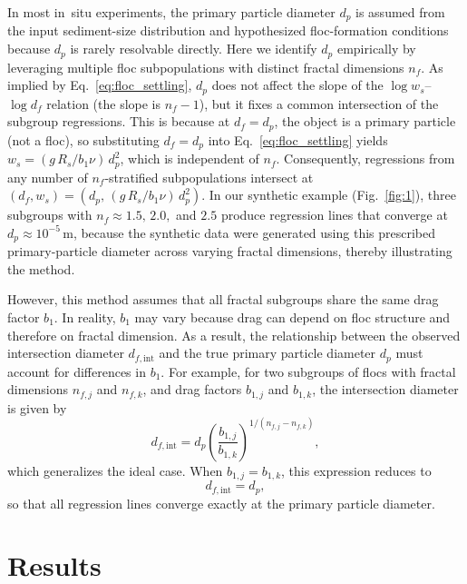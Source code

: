 \documentclass{agujournal2019}
\begin{document}
In most in~situ experiments, the primary particle diameter \(d_p\) is assumed from the input sediment-size distribution and hypothesized floc-formation conditions because \(d_p\) is rarely resolvable directly. Here we identify \(d_p\) empirically by leveraging multiple floc subpopulations with distinct fractal dimensions \(n_f\). As implied by Eq.~\eqref{eq:floc_settling}, \(d_p\) does not affect the slope of the \(\log w_s\)–\(\log d_f\) relation (the slope is \(n_f-1\)), but it fixes a common intersection of the subgroup regressions. This is because at \(d_f=d_p\), the object is a primary particle (not a floc), so substituting \(d_f=d_p\) into Eq.~\eqref{eq:floc_settling} yields \(w_s=(g\,R_s/b_1\nu)\,d_p^{2}\), which is independent of \(n_f\). Consequently, regressions from any number of \(n_f\)-stratified subpopulations intersect at \((d_f, w_s)=(d_p,\,(g\,R_s/b_1\nu)\,d_p^{2})\). In our synthetic example (Fig.~\ref{fig:1}), three subgroups with \(n_f \approx 1.5,\,2.0,\) and \(2.5\) produce regression lines that converge at \(d_p \approx 10^{-5}\,\mathrm{m}\), because the synthetic data were generated using this prescribed primary-particle diameter across varying fractal dimensions, thereby illustrating the method.

However, this method assumes that all fractal subgroups share the same drag factor \(b_1\). In reality, \(b_1\) may vary because drag can depend on floc structure and therefore on fractal dimension. As a result, the relationship between the observed intersection diameter \(d_{f,\mathrm{int}}\) and the true primary particle diameter \(d_p\) must account for differences in \(b_1\). For example, for two subgroups of flocs with fractal dimensions \(n_{f,j}\) and \(n_{f,k}\), and drag factors \(b_{1,j}\) and \(b_{1,k}\), the intersection diameter is given by
\begin{equation}
d_{f,\mathrm{int}} = d_p \left( \frac{b_{1,j}}{b_{1,k}} \right)^{1/(n_{f,j} - n_{f,k})},
\label{eq:dpintersection}
\end{equation}
which generalizes the ideal case. When \(b_{1,j}=b_{1,k}\), this expression reduces to
\begin{equation}
d_{f,\mathrm{int}} = d_p,
\label{eq:dpintersectionideal}
\end{equation}
so that all regression lines converge exactly at the primary particle diameter.



\section{Results}
\end{document}
